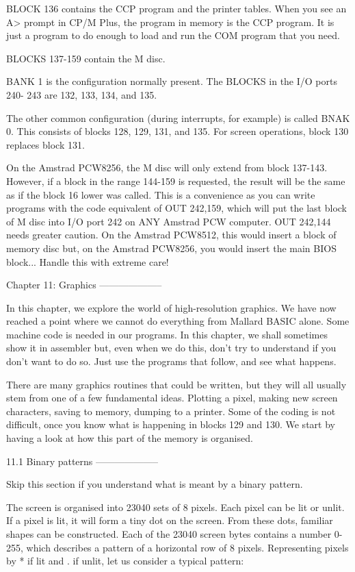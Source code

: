 BLOCK 136 contains the CCP program and the printer tables. When you see an  A> 
prompt  in CP/M Plus, the program in memory is the CCP program. It is  just  a 
program to do enough to load and run the COM program that you need.

BLOCKS 137-159 contain the M disc.

BANK 1 is the configuration normally present. The BLOCKS in the I/O ports 240-
243 are 132, 133, 134, and 135.

The other common configuration (during interrupts, for example) is called BNAK 
0.  This  consists of blocks 128, 129, 131, and 135.  For  screen  operations, 
block 130 replaces block 131.

On  the  Amstrad  PCW8256, the M disc will only  extend  from  block  137-143. 
However, if a block in the range 144-159 is requested, the result will be  the 
same  as  if the block 16 lower was called. This is a convenience as  you  can 
write  programs  with the code equivalent of OUT 242,159, which will  put  the 
last  block  of  M disc into I/O port 242 on ANY  Amstrad  PCW  computer.  OUT 
242,144  needs  greater caution. On the Amstrad PCW8512, this would  insert  a 
block  of memory disc but, on the Amstrad PCW8256, you would insert  the  main 
BIOS block... Handle this with extreme care!


Chapter 11: Graphics
--------------------

In this chapter, we explore the world of high-resolution graphics. We have now 
reached  a point where we cannot do everything from Mallard BASIC alone.  Some 
machine  code is needed in our programs. In this chapter, we  shall  sometimes 
show it in assembler but, even when we do this, don't try to understand if you 
don't want to do so. Just use the programs that follow, and see what happens.

There  are  many graphics routines that could be written, but  they  will  all 
usually stem from one of a few fundamental ideas. Plotting a pixel, making new 
screen characters, saving to memory, dumping to a printer. Some of the  coding 
is  not difficult, once you know what is happening in blocks 129 and  130.  We 
start by having a look at how this part of the memory is organised.


11.1 Binary patterns
--------------------

Skip this section if you understand what is meant by a binary pattern.

The screen is organised into 23040 sets of 8 pixels. Each pixel can be lit  or 
unlit.  If a pixel is lit, it will form a tiny dot on the screen.  From  these 
dots,  familiar  shapes  can be constructed. Each of the  23040  screen  bytes 
contains  a number 0-255, which describes a pattern of a horizontal row  of  8 
pixels.  Representing  pixels by * if lit and . if unlit, let  us  consider  a 
typical pattern:

